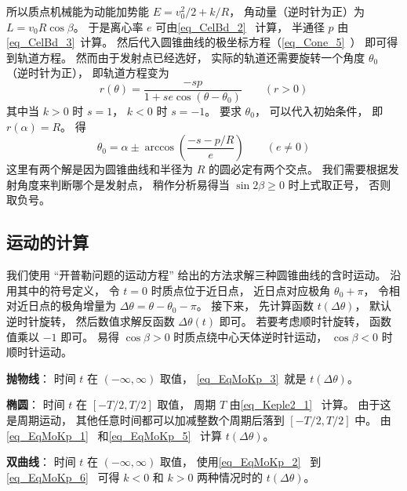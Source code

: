 所以质点机械能为动能加势能 $E = v_0^2/2 + k/R$， 角动量（逆时针为正）为 $L = v_0 R\cos\beta$。 于是离心率 $e$ 可由\autoref{eq_CelBd_2}~ 计算， 半通径 $p$ 由\autoref{eq_CelBd_3}~计算。 然后代入圆锥曲线的极坐标方程（\autoref{eq_Cone_5}~） 即可得到轨道方程。 然而由于发射点已经选好， 实际的轨道还需要旋转一个角度 $\theta_0$ （逆时针为正）， 即轨道方程变为
\begin{equation}\label{eq_KepNum_1}
r(\theta)  = \frac{-s p}{1 + s e\cos (\theta-\theta_0)} \qquad (r > 0)
\end{equation}
其中当 $k>0$ 时 $s=1$， $k<0$ 时 $s=-1$。 要求 $\theta_0$， 可以代入初始条件， 即 $r(\alpha) = R$。 得
\begin{equation}
\theta_0 = \alpha \pm \arccos(\frac{-s - p/R}{e}) \qquad (e\ne 0)
\end{equation}
这里有两个解是因为圆锥曲线和半径为 $R$ 的圆必定有两个交点。 我们需要根据发射角度来判断哪个是发射点， 稍作分析易得当 $\sin2\beta \geqslant 0$ 时上式取正号， 否则取负号。

\subsection{运动的计算}


我们使用 “开普勒问题的运动方程” 给出的方法求解三种圆锥曲线的含时运动。 沿用其中的符号定义， 令 $t=0$ 时质点位于近日点，  近日点对应极角 $\theta_0 + \pi$， 令相对近日点的极角增量为 $\Delta\theta = \theta - \theta_0 - \pi$。 接下来， 先计算函数 $t(\Delta\theta)$， 默认逆时针旋转， 然后数值求解反函数 $\Delta\theta(t)$ 即可。 若要考虑顺时针旋转， 函数值乘以 $-1$ 即可。 易得 $\cos\beta > 0$ 时质点绕中心天体逆时针运动， $\cos\beta < 0$ 时顺时针运动。

\textbf{抛物线}： 时间 $t$ 在 $(-\infty,\infty)$ 取值， \autoref{eq_EqMoKp_3}~就是 $t(\Delta\theta)$。

\textbf{椭圆}： 时间 $t$ 在 $[-T/2,T/2]$ 取值， 周期 $T$ 由\autoref{eq_Keple2_1}~ 计算。 由于这是周期运动， 其他任意时间都可以加减整数个周期后落到 $[-T/2,T/2]$ 中。 由\autoref{eq_EqMoKp_1}~ 和\autoref{eq_EqMoKp_5}~ 计算 $t(\Delta\theta)$。

\textbf{双曲线}： 时间 $t$ 在 $(-\infty,\infty)$ 取值， 使用\autoref{eq_EqMoKp_2}~ 到\autoref{eq_EqMoKp_6}~ 可得 $k<0$ 和 $k>0$ 两种情况时的 $t(\Delta\theta)$。

